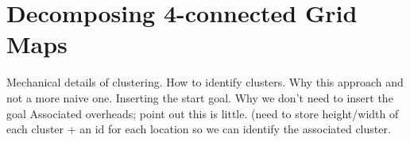 \section{Decomposing 4-connected Grid Maps}
Mechanical details of clustering.
How to identify clusters.
Why this approach and not a more naive one.
Inserting the start goal.
Why we don't need to insert the goal
Associated overheads; point out this is little.
(need to store height/width of each cluster + an id for each
location so we can identify the associated cluster.
